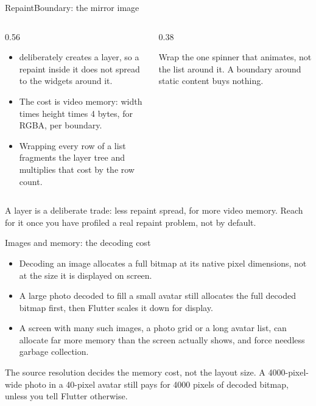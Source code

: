 \documentclass[10pt,aspectratio=169,t]{beamer}
\begin{document}
\begin{frame}[eyebrow=Optimization]{RepaintBoundary: the mirror image}
  \begin{columns}[T]
    \begin{column}{0.56\textwidth}
      \begin{itemize}
        \item {} deliberately creates a layer, so a repaint inside it does not spread to the widgets around it.
        \item The cost is video memory: width times height times 4 bytes, for RGBA, per boundary.
        \item Wrapping every row of a list fragments the layer tree and multiplies that cost by the row count.
      \end{itemize}
    \end{column}
    \begin{column}{0.38\textwidth}
      \begin{warning}
        Wrap the one spinner that animates, not the list around it. A boundary around static content buys nothing.
      \end{warning}
    \end{column}
  \end{columns}
  \begin{takeaway}{A layer is a deliberate trade: less repaint spread, for more video memory.}
    Reach for it once you have profiled a real repaint problem, not by default.
  \end{takeaway}
\end{frame}

\begin{frame}[eyebrow=Optimization]{Images and memory: the decoding cost}
  \begin{itemize}
    \item Decoding an image allocates a full bitmap at its native pixel dimensions, not at the size it is displayed on screen.
    \item A large photo decoded to fill a small avatar still allocates the full decoded bitmap first, then Flutter scales it down for display.
    \item A screen with many such images, a photo grid or a long avatar list, can allocate far more memory than the screen actually shows, and force needless garbage collection.
  \end{itemize}
  \begin{takeaway}{The source resolution decides the memory cost, not the layout size.}
    A 4000-pixel-wide photo in a 40-pixel avatar still pays for 4000 pixels of decoded bitmap, unless you tell Flutter otherwise.
  \end{takeaway}
\end{frame}
\end{document}
